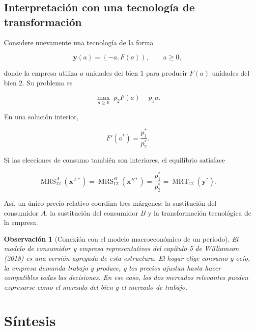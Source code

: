 \documentclass[12pt]{article}
\theoremstyle{cideplain}
\theoremstyle{cidedef}
\newtheorem{remark}[theorem]{Observación}
\DeclareMathOperator{\MRS}{MRS}
\DeclareMathOperator{\MRT}{MRT}
\newcommand{\x}{\bm x}
\newcommand{\y}{\bm y}
\begin{document}
\subsection{Interpretación con una tecnología de transformación}

Considere nuevamente una tecnología de la forma

\[
  \y(a)=(-a,F(a)),
  \qquad a\geq 0,
\]

donde la empresa utiliza \(a\) unidades del bien \(1\) para producir \(F(a)\) unidades del
bien \(2\). Su problema es

\[
  \max_{a\geq 0}\;p_2F(a)-p_1a.
\]

En una solución interior,

\[
  F'(a^*)=\frac{p_1^*}{p_2^*}.
\]

Si las elecciones de consumo también son interiores, el equilibrio satisface

\[
  \MRS_{12}^{A}(\x^{A*})
  =
  \MRS_{12}^{B}(\x^{B*})
  =
  \frac{p_1^*}{p_2^*}
  =
  \MRT_{12}(\y^*).
\]

Así, un único precio relativo coordina tres márgenes: la sustitución del consumidor \(A\),
la sustitución del consumidor \(B\) y la transformación tecnológica de la empresa.

\begin{remark}[Conexión con el modelo macroeconómico de un periodo]
El modelo de consumidor y empresa representativos del capítulo 5 de Williamson (2018)
es una versión agregada de esta estructura. El hogar elige consumo y ocio, la empresa
demanda trabajo y produce, y los precios ajustan hasta hacer compatibles todas las
decisiones. En ese caso, los dos mercados relevantes pueden expresarse como el mercado del
bien y el mercado de trabajo.
\end{remark}

\section{Síntesis}
\end{document}
